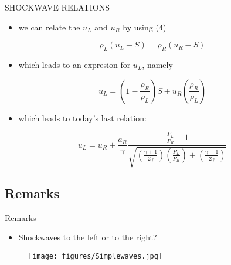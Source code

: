 \documentclass{beamer}
\begin{document}
\begin{frame}{SHOCKWAVE RELATIONS}
  \begin{itemize}
   \item we can relate the $u_L$ and $u_R$ by using \alert{(4)}
  \end{itemize}
  \begin{equation}
   \rho_L(u_L-S)=\rho_R(u_R-S)
  \end{equation}
  \begin{itemize}
   \item which leads to an expresion for $u_L$, namely
  \end{itemize}
  \begin{equation}
   u_L=\left (1-\frac{\rho_R}{\rho_L}  \right )S+u_R\left ( \frac{\rho_R}{\rho_L} \right )
  \end{equation}
  \begin{itemize}
   \item which leads to today's last relation:
  \end{itemize}
  \begin{equation}
   u_L=u_R+\frac{a_R}{\gamma}\frac{\frac{P_L}{P_R}-1}{\sqrt{\left ( \frac{\gamma+1}{2\gamma} \right )\left ( \frac{P_L}{P_R} \right )+\left ( \frac{\gamma-1}{2\gamma} \right )}}
  \end{equation}
\end{frame}

\subsection{Remarks}

\begin{frame}{Remarks}
  \begin{itemize}
   \item Shockwaves to the left or to the right?
  \end{itemize}
  \begin{figure}
   \texttt{[image: figures/Simplewaves.jpg]}
  \end{figure}
\end{frame}
\end{document}
